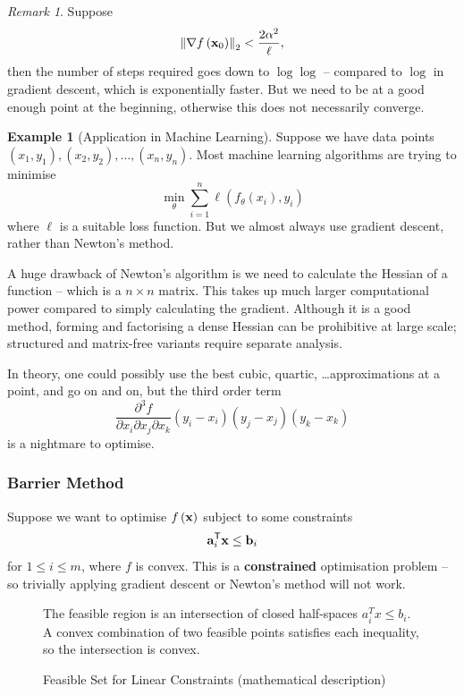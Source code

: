\documentclass[11pt]{article}
\theoremstyle{definition}
\newtheorem{example}[theorem]{Example}
\theoremstyle{remark}
\newtheorem{remark}[theorem]{Remark}
\newcommand{\pqty}[1]{\left(#1\right)}
\newcommand{\transpose}{^{\mathsf{T}}}
\newcommand{\grad}{\nabla}
\begin{document}
\begin{remark}\label{optim-unit-0022}
    Suppose
    \[
        \norm[2]{\grad f\pqty{\vb{x}_0}} < \frac{2 \alpha^2}{\ell},
    \]
    then the number of steps required goes down to \(\log \log\) -- compared to \(\log\) in gradient descent, which is exponentially faster. But we need to be at a good enough point at the beginning, otherwise this does not necessarily converge.
\end{remark}

\begin{example}[Application in Machine Learning]\label{optim-unit-0023}
    Suppose we have data points \(\pqty{x_1, y_1}, \pqty{x_2, y_2}, \ldots, \pqty{x_n, y_n}\). Most machine learning algorithms are trying to minimise
    \[
        \min_{\theta} \sum_{i = 1}^{n} \ell\pqty{f_{\theta} \pqty{x_i}, y_i}
    \]
    where \(\ell\) is a suitable loss function. But we almost always use gradient descent, rather than Newton's method.
\end{example}

A huge drawback of Newton's algorithm is we need to calculate the Hessian of a function -- which is a \(n \times n\) matrix. This takes up much larger computational power compared to simply calculating the gradient. Although it is a good method, forming and factorising a dense Hessian can be prohibitive at large scale; structured and matrix-free variants require separate analysis.

In theory, one could possibly use the best cubic, quartic, \dots approximations at a point, and go on and on, but the third order term
\[
    \frac{\partial^3 f}{\partial x_i \partial x_j \partial x_k} \pqty{y_i - x_i} \pqty{y_j - x_j} \pqty{y_k - x_k}
\]
is a nightmare to optimise.

\subsubsection{Barrier Method}

Suppose we want to optimise \(f\pqty{\vb{x}}\) subject to some constraints
\[
    \vb{a}_i \transpose \vb{x} \leq \vb{b}_i
\]
for \(1 \leq i \leq m\), where \(f\) is convex. This is a \textbf{constrained} optimisation problem -- so trivially applying gradient descent or Newton's method will not work.

\begin{figure}[ht!]\centering\begin{minipage}{0.94\linewidth}The feasible region is an intersection of closed half-spaces \(a_i^Tx\le b_i\). A convex combination of two feasible points satisfies each inequality, so the intersection is convex.\end{minipage}\caption{Feasible Set for Linear Constraints (mathematical description)}\label{fig:feasible-set-linear-constraints}\end{figure}
\end{document}
